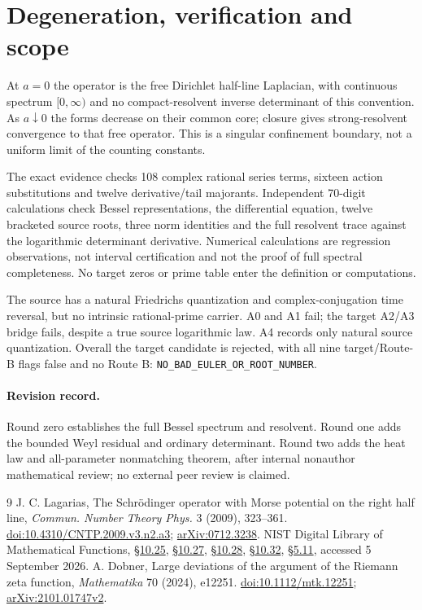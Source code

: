 \documentclass[10pt]{article}
\begin{document}
\section{Degeneration, verification and scope}
At $a=0$ the operator is the free Dirichlet half-line Laplacian, with
continuous spectrum $[0,\infty)$ and no compact-resolvent inverse
determinant of this convention. As $a\downarrow0$ the forms decrease
on their common core; closure gives strong-resolvent convergence to that
free operator. This is a singular confinement boundary, not a uniform
limit of the counting constants.

The exact evidence checks 108 complex rational series terms, sixteen
action substitutions and twelve derivative/tail majorants. Independent
70-digit calculations check Bessel representations, the differential
equation, twelve bracketed source roots, three norm identities and the
full resolvent trace against the logarithmic determinant derivative.
Numerical calculations are regression observations, not interval
certification and not the proof of full spectral completeness.
No target zeros or prime table enter the definition or computations.

The source has a natural Friedrichs quantization and complex-conjugation
time reversal, but no intrinsic rational-prime carrier. A0 and A1 fail;
the target A2/A3 bridge fails, despite a true source logarithmic law.
A4 records only natural source quantization. Overall the target candidate
is rejected, with all nine target/Route-B flags false and no Route B:
\texttt{NO\_BAD\_EULER\_OR\_ROOT\_NUMBER}.

\paragraph{Revision record.}
\ifcase\CRevisionRound Round zero establishes the full Bessel spectrum and resolvent.
\or Round one adds the bounded Weyl residual and ordinary determinant.
\else Round two adds the heat law and all-parameter nonmatching theorem,
after internal nonauthor mathematical review; no external peer review is claimed.\fi

\begin{thebibliography}{9}
 J. C. Lagarias, The Schrödinger operator with Morse potential
on the right half line, \emph{Commun. Number Theory Phys.} 3 (2009), 323--361.
\href{https://doi.org/10.4310/CNTP.2009.v3.n2.a3}{doi:10.4310/CNTP.2009.v3.n2.a3};
\href{https://arxiv.org/abs/0712.3238}{arXiv:0712.3238}.
 NIST Digital Library of Mathematical Functions,
\href{https://dlmf.nist.gov/10.25}{§10.25},
\href{https://dlmf.nist.gov/10.27}{§10.27},
\href{https://dlmf.nist.gov/10.28}{§10.28},
\href{https://dlmf.nist.gov/10.32}{§10.32},
\href{https://dlmf.nist.gov/5.11}{§5.11}, accessed 5 September 2026.
 A. Dobner, Large deviations of the argument of the Riemann
zeta function, \emph{Mathematika} 70 (2024), e12251.
\href{https://doi.org/10.1112/mtk.12251}{doi:10.1112/mtk.12251};
\href{https://arxiv.org/abs/2101.01747}{arXiv:2101.01747v2}.
\end{thebibliography}
\end{document}
